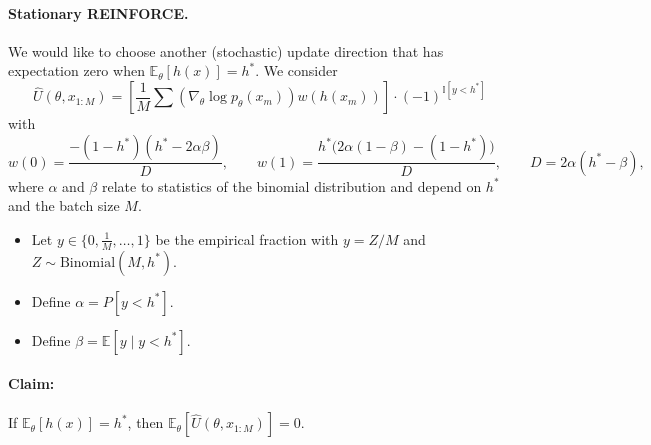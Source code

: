 \documentclass{article}
\begin{document}
\paragraph{Stationary REINFORCE.}
We would like to choose another (stochastic) update direction that has expectation zero when $\mathbb{E}_\theta[h(x)] = h^*$. We consider
\[
    \hat U(\theta, x_{1:M}) = \left[\frac{1}{M}\sum (\nabla_\theta \log p_\theta(x_m))w(h(x_m))\right] \cdot (-1)^{\mathbb{I}[y < h^*]}
\]
with
\[
    w(0) = \frac{-(1-h^*)(h^* - 2\alpha\beta)}{D}, \qquad w(1) = \frac{h^*\bigl(2\alpha(1-\beta)-(1-h^*)\bigr)}{D}, \qquad D = 2\alpha(h^* - \beta),
\]
where $\alpha$ and $\beta$ relate to statistics of the binomial distribution and depend on $h^*$ and the batch size $M$. 
\begin{itemize}
    \item Let $y \in \{0, \tfrac{1}{M}, \dots, 1\}$ be the empirical fraction with $y = Z/M$ and $Z \sim \mathrm{Binomial}(M, h^*)$.
    \item Define $\alpha = P\!\left[y < h^*\right]$. 
    \item Define $\beta = \mathbb{E}\!\left[y \mid y < h^*\right]$.
\end{itemize}

\paragraph{Claim:} If $\mathbb{E}_\theta[h(x)] = h^*$, then $\mathbb{E}_\theta[\hat U(\theta, x_{1:M})] = 0$.
\end{document}
